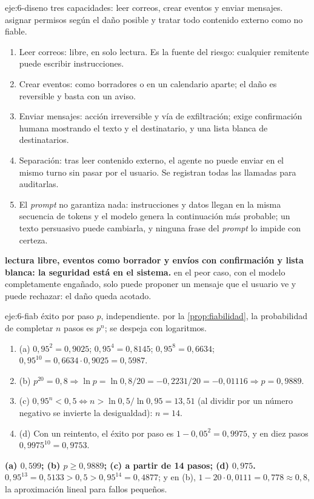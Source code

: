 \begin{solucion}{eje:6-diseno}
\datos tres capacidades: leer correos, crear eventos y enviar mensajes.
\planteamiento asignar permisos según el daño posible y tratar todo contenido externo como no fiable.
\pasos
\begin{enumerate}[label=\arabic*.]
  \item Leer correos: libre, en solo lectura. Es la fuente del riesgo: cualquier remitente puede escribir instrucciones.
  \item Crear eventos: como borradores o en un calendario aparte; el daño es reversible y basta con un aviso.
  \item Enviar mensajes: acción irreversible y vía de exfiltración; exige confirmación humana mostrando el texto y el destinatario, y una lista blanca de destinatarios.
  \item Separación: tras leer contenido externo, el agente no puede enviar en el mismo turno sin pasar por el usuario. Se registran todas las llamadas para auditarlas.
  \item El \emph{prompt} no garantiza nada: instrucciones y datos llegan en la misma secuencia de tokens y el modelo genera la continuación más probable; un texto persuasivo puede cambiarla, y ninguna frase del \emph{prompt} lo impide con certeza.
\end{enumerate}
\resultado \textbf{lectura libre, eventos como borrador y envíos con confirmación y lista blanca: la seguridad está en el sistema.}
\comprobacion en el peor caso, con el modelo completamente engañado, solo puede proponer un mensaje que el usuario ve y puede rechazar: el daño queda acotado.
\end{solucion}

\begin{solucion}{eje:6-fiab}
\datos éxito por paso $p$, independiente.
\planteamiento por la \cref{prop:fiabilidad}, la probabilidad de completar $n$ pasos es $p^{n}$; se despeja con logaritmos.
\pasos
\begin{enumerate}[label=\arabic*.]
  \item (a) $0{,}95^{2}=0{,}9025$; $0{,}95^{4}=0{,}8145$; $0{,}95^{8}=0{,}6634$; $0{,}95^{10}=0{,}6634\cdot 0{,}9025=0{,}5987$.
  \item (b) $p^{20}=0{,}8\Rightarrow\ln p=\ln 0{,}8/20=-0{,}2231/20=-0{,}01116\Rightarrow p=0{,}9889$.
  \item (c) $0{,}95^{n}<0{,}5\iff n>\ln 0{,}5/\ln 0{,}95=13{,}51$ (al dividir por un número negativo se invierte la desigualdad): $n=14$.
  \item (d) Con un reintento, el éxito por paso es $1-0{,}05^{2}=0{,}9975$, y en diez pasos $0{,}9975^{10}=0{,}9753$.
\end{enumerate}
\resultado \textbf{(a) $0{,}599$; (b) $p\ge 0{,}9889$; (c) a partir de 14 pasos; (d) $0{,}975$.}
\comprobacion $0{,}95^{13}=0{,}5133>0{,}5>0{,}95^{14}=0{,}4877$; y en (b), $1-20\cdot 0{,}0111=0{,}778\approx 0{,}8$, la aproximación lineal para fallos pequeños.
\end{solucion}

